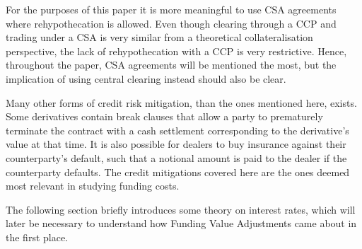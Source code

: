 \documentclass[main.tex]{subfiles}
\begin{document}
        For the purposes of this paper it is more meaningful to use CSA agreements 
        where rehypothecation is allowed.
        Even though clearing through a CCP and trading under a CSA is very similar
        from a theoretical collateralisation perspective,
        the lack of rehypothecation with a CCP is very restrictive.
        Hence, throughout the paper, CSA agreements will be mentioned the most,
        but the implication of using central clearing instead should also be clear.

    Many other forms of credit risk mitigation, than the ones mentioned here, exists. 
    Some derivatives contain break clauses that allow a party to prematurely terminate the 
    contract with a cash settlement corresponding to the derivative's value at that time.
    It is also possible for dealers to buy insurance against their counterparty's default,
    such that a notional amount is paid to the dealer if the counterparty defaults.
    The credit mitigations covered here are the ones deemed most relevant in studying funding costs.

    The following section briefly introduces some theory on interest rates,
    which will later be necessary to understand how Funding Value Adjustments 
    came about in the first place.
\end{document}
